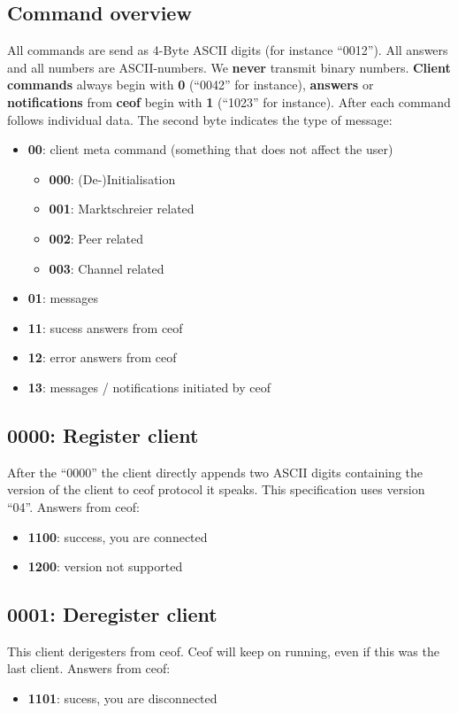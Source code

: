 \documentclass[12pt,a4paper]{book}
\begin{document}
\subsection{Command overview}
All commands are send as 4-Byte ASCII digits (for instance "`0012"').
All answers and all numbers are ASCII-numbers. We
\textbf{never} transmit binary numbers.
\textbf{Client commands} always begin with \textbf{0} ("`0042"' for instance),
\textbf{answers} or \textbf{notifications} from
\textbf{ceof} begin with \textbf{1} ("`1023"' for instance).
After each command follows individual data. The second byte indicates the type of message:
\begin{itemize}
\item \textbf{00}: client meta command (something that does not affect the user)
\begin{itemize}
\item \textbf{000}: (De-)Initialisation
\item \textbf{001}: Marktschreier related
\item \textbf{002}: Peer related
\item \textbf{003}: Channel related
\end{itemize}
\item \textbf{01}: messages
\item \textbf{11}: sucess answers from ceof
\item \textbf{12}: error answers from ceof
\item \textbf{13}: messages / notifications initiated by ceof
\end{itemize}

\subsection{0000: Register client}
After the "`0000"' the client directly appends two ASCII digits containing the
version of the client to ceof protocol it speaks. This specification uses version
"`04"'.
Answers from ceof:
\begin{itemize}
\item \textbf{1100}: success, you are connected
\item \textbf{1200}: version not supported
\end{itemize}
\subsection{0001: Deregister client}
This client derigesters from ceof. Ceof will keep on running, even if this
was the last client.
Answers from ceof:
\begin{itemize}
\item \textbf{1101}: sucess, you are disconnected
\end{itemize}
\end{document}
